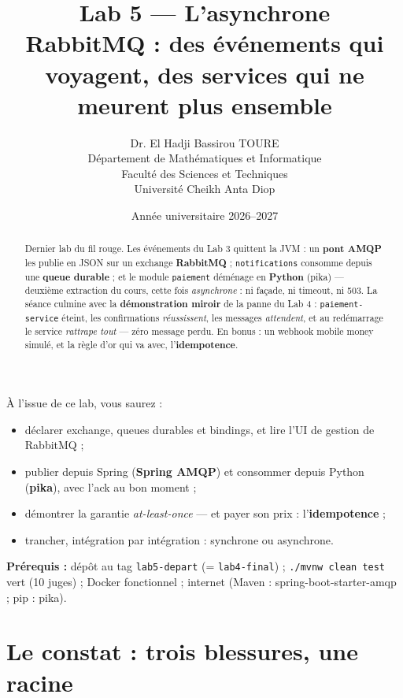 \documentclass[a4paper,11pt]{article}
\title{\textcolor{titlecolor}{\Huge\textbf{Lab 5 --- L'asynchrone}}\\[0.5em]
       \textcolor{sectitlecolor}{\LARGE RabbitMQ : des événements qui voyagent, des services qui ne meurent plus ensemble}}
\author{Dr. El Hadji Bassirou TOURE\\
        Département de Mathématiques et Informatique\\
        Faculté des Sciences et Techniques\\
        Université Cheikh Anta Diop}
\date{Année universitaire 2026--2027}
\begin{document}
\maketitle
\thispagestyle{empty}

\begin{abstract}
\noindent Dernier lab du fil rouge. Les événements du Lab 3 quittent la JVM :
un \textbf{pont AMQP} les publie en JSON sur un exchange \textbf{RabbitMQ} ;
\texttt{notifications} consomme depuis une \textbf{queue durable} ; et le
module \texttt{paiement} déménage en \textbf{Python} (pika) --- deuxième
extraction du cours, cette fois \emph{asynchrone} : ni façade, ni timeout,
ni 503. La séance culmine avec la \textbf{démonstration miroir} de la panne
du Lab 4 : \texttt{paiement-service} éteint, les confirmations
\emph{réussissent}, les messages \emph{attendent}, et au redémarrage le
service \emph{rattrape tout} --- zéro message perdu. En bonus : un webhook
mobile money simulé, et la règle d'or qui va avec, l'\textbf{idempotence}.
\end{abstract}

\begin{benefitbox}
À l'issue de ce lab, vous saurez :
\begin{itemize}[nosep]
  \item déclarer exchange, queues durables et bindings, et lire l'UI de
        gestion de RabbitMQ ;
  \item publier depuis Spring (\textbf{Spring AMQP}) et consommer depuis
        Python (\textbf{pika}), avec l'ack au bon moment ;
  \item démontrer la garantie \emph{at-least-once} --- et payer son prix :
        l'\textbf{idempotence} ;
  \item trancher, intégration par intégration : synchrone ou asynchrone.
\end{itemize}
\end{benefitbox}

\begin{warningbox}
\textbf{Prérequis :} dépôt au tag \texttt{lab5-depart} (= \texttt{lab4-final}) ;
\texttt{./mvnw clean test} vert (10 juges) ; Docker fonctionnel ; internet
(Maven : spring-boot-starter-amqp ; pip : pika).
\end{warningbox}

\tableofcontents
\newpage

\section{Le constat : trois blessures, une racine}
\end{document}
